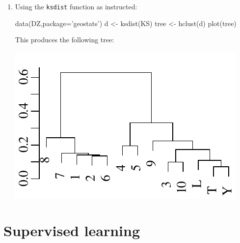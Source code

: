 \begin{enumerate}
\item Using the \texttt{ksdist} function as instructed:

\begin{script}
data(DZ,package='geostats')
d <- ksdist(KS)
tree <- hclust(d)
plot(tree)
\end{script}

This produces the following tree:

\noindent\begin{minipage}[t][][b]{.35\linewidth}
\includegraphics[width=\textwidth]{../figures/DZtree.pdf}\medskip
\end{minipage}
\begin{minipage}[t][][t]{.65\linewidth}
  \label{fig:DZtree}
\end{minipage}

\end{enumerate}

\section{Supervised learning}
\label{sec:sol-supervised}

